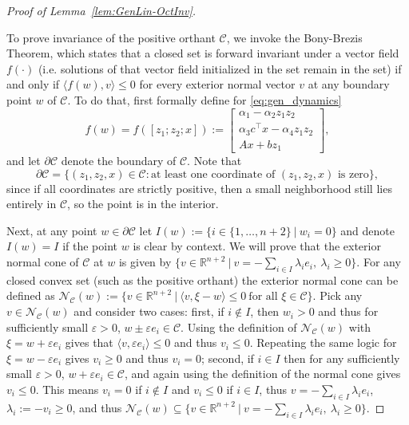 \documentclass{article}
\begin{document}
\begin{proof}[Proof of Lemma~\ref{lem:GenLin-OctInv}]\label{pr:lemma}

    To prove invariance of the positive orthant $\mathcal{C}$, we invoke the Bony-Brezis Theorem, which states that a closed set is forward invariant under a vector field $f(\cdot)$ (i.e. solutions of that vector field initialized in the set remain in the set) if and only if $\langle f(w),v\rangle\leq0$ for every exterior normal vector $v$ at any boundary point $w$ of $\mathcal{C}$. To do that, first formally define for \eqref{eq:gen_dynamics}
    \begin{equation*}
        f(w) = f([z_1;z_2;x]):=\begin{bmatrix}
            \alpha_1-\alpha_2z_1z_2 \\ \alpha_3c^\top x-\alpha_4z_1z_2 \\ Ax+bz_1
        \end{bmatrix},
    \end{equation*}
    and let $\partial\mathcal{C}$ denote the boundary of $\mathcal{C}$. 
    Note that
    \begin{equation*}
        \partial\mathcal{C} = \{(z_1,z_2,x)\in\mathcal{C} : 
        \text{at least one coordinate of } (z_1,z_2,x) \text{ is zero}\},
    \end{equation*}
    since if all coordinates are strictly positive, then a small neighborhood 
    still lies entirely in $\mathcal{C}$, so the point is in the interior.

    Next, at any point $w\in\partial\mathcal{C}$ let $I(w):=\{i\in\{1,\dots,n+2\}~|~w_i=0\}$ and denote $I(w)=I$ if the point $w$ is clear by context. We will prove that the exterior normal cone of $\mathcal{C}$ at $w$ is given by $\{v\in\mathbb{R}^{n+2}~|~v=-\sum_{i\in I}\lambda_ie_i,~\lambda_i\ge0\}$. For any closed convex set (such as the positive orthant) the exterior normal cone can be defined as $\mathcal{N}_{\mathcal{C}}(w):=\{v\in\mathbb{R}^{n+2}~|~\langle v,\xi-w\rangle\leq 0~\text{for all }\xi\in\mathcal{C}\}$. Pick any $v\in\mathcal{N}_{\mathcal{C}}(w)$ and consider two cases: first, if $i\not\in I$, then $w_i>0$ and thus for sufficiently small $\varepsilon>0$, $w\pm\varepsilon e_i\in \mathcal{C}$. Using the definition of $\mathcal{N}_{\mathcal{C}}(w)$ with $\xi=w+\varepsilon e_i$ gives that $\langle v,\varepsilon e_i\rangle \leq 0$ and thus $v_i\leq 0$. Repeating the same logic for $\xi=w-\varepsilon e_i$ gives $v_i\geq 0$ and thus $v_i=0$; second, if $i\in I$ then for any sufficiently small $\varepsilon>0$, $w+\varepsilon e_i\in\mathcal{C}$, and again using the definition of the normal cone gives $v_i\leq 0$. This means $v_i=0$ if $i\not\in I$ and $v_i\leq 0$ if $i\in I$, thus $v=-\sum_{i\in I}\lambda_i e_i$, $\lambda_i:=-v_i\geq 0$, and thus $\mathcal{N}_{\mathcal{C}}(w)\subseteq\{v\in\mathbb{R}^{n+2}~|~v=-\sum_{i\in I}\lambda_ie_i,~\lambda_i\ge0\}$.


\end{proof}
\end{document}
